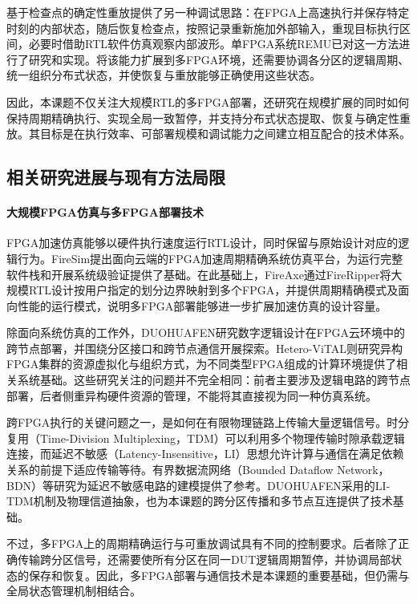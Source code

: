 基于检查点的确定性重放提供了另一种调试思路：在FPGA上高速执行并保存特定时刻的内部状态，随后恢复检查点，按照记录重新施加外部输入，重现目标执行区间，必要时借助RTL软件仿真观察内部波形。单FPGA系统REMU已对这一方法进行了研究和实现\cite{chen_remu_2023}。将该能力扩展到多FPGA环境，还需要协调各分区的逻辑周期、统一组织分布式状态，并使恢复与重放能够正确使用这些状态。

因此，本课题不仅关注大规模RTL的多FPGA部署，还研究在规模扩展的同时如何保持周期精确执行、实现全局一致暂停，并支持分布式状态提取、恢复与确定性重放。其目标是在执行效率、可部署规模和调试能力之间建立相互配合的技术体系。

\subsection{相关研究进展与现有方法局限}

\paragraph{大规模FPGA仿真与多FPGA部署技术}

FPGA加速仿真能够以硬件执行速度运行RTL设计，同时保留与原始设计对应的逻辑行为。FireSim提出面向云端的FPGA加速周期精确系统仿真平台，为运行完整软件栈和开展系统级验证提供了基础\cite{chung_firesim_2018}。在此基础上，FireAxe通过FireRipper将大规模RTL设计按用户指定的划分边界映射到多个FPGA，并提供周期精确模式及面向性能的运行模式，说明多FPGA部署能够进一步扩展加速仿真的设计容量\cite{whangbo_fireaxe_2024}。

除面向系统仿真的工作外，DUOHUAFEN研究数字逻辑设计在FPGA云环境中的跨节点部署，并围绕分区接口和跨节点通信开展探索\cite{zhu_duohuafen_2024}。Hetero-ViTAL则研究异构FPGA集群的资源虚拟化与组织方式，为不同类型FPGA组成的计算环境提供了相关系统基础\cite{zha_hetero-vital_2021}。这些研究关注的问题并不完全相同：前者主要涉及逻辑电路的跨节点部署，后者侧重异构硬件资源的管理，不能将其直接视为同一种仿真系统。

跨FPGA执行的关键问题之一，是如何在有限物理链路上传输大量逻辑信号。时分复用（Time-Division Multiplexing，TDM）可以利用多个物理传输时隙承载逻辑连接，而延迟不敏感（Latency-Insensitive，LI）思想允许计算与通信在满足依赖关系的前提下适应传输等待。有界数据流网络（Bounded Dataflow Network，BDN）等研究为延迟不敏感电路的建模提供了参考\cite{babb_virtual_1993,libdn_2009}。DUOHUAFEN采用的LI-TDM机制及物理信道抽象，也为本课题的跨分区传播和多节点互连提供了技术基础\cite{zhu_duohuafen_2024}。

不过，多FPGA上的周期精确运行与可重放调试具有不同的控制要求。后者除了正确传输跨分区信号，还需要使所有分区在同一DUT逻辑周期暂停，并协调局部状态的保存和恢复。因此，多FPGA部署与通信技术是本课题的重要基础，但仍需与全局状态管理机制相结合。

